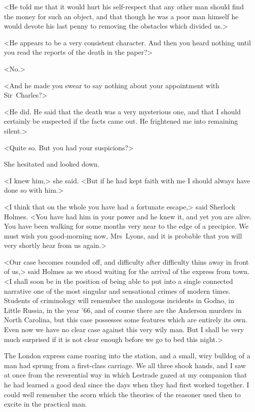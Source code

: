 <He told me that it would hurt his self-respect that any other man should find the money for such an object, and that though he was a poor man himself he would devote his last penny to removing the obstacles which divided us.>

<He appears to be a very consistent character. And then you heard nothing until you read the reports of the death in the paper?>

<No.>

<And he made you swear to say nothing about your appointment with Sir~Charles?>

<He did. He said that the death was a very mysterious one, and that I should certainly be suspected if the facts came out. He frightened me into remaining silent.>

<Quite so. But you had your suspicions?>

She hesitated and looked down.

<I knew him,> she said. <But if he had kept faith with me I should always have done so with him.>

<I think that on the whole you have had a fortunate escape,> said Sherlock Holmes. <You have had him in your power and he knew it, and yet you are alive. You have been walking for some months very near to the edge of a precipice. We must wish you good-morning now, Mrs~Lyons, and it is probable that you will very shortly hear from us again.>

<Our case becomes rounded off, and difficulty after difficulty thins away in front of us,> said Holmes as we stood waiting for the arrival of the express from town. <I shall soon be in the position of being able to put into a single connected narrative one of the most singular and sensational crimes of modern times. Students of criminology will remember the analogous incidents in Godno, in Little Russia, in the year '66, and of course there are the Anderson murders in North Carolina, but this case possesses some features which are entirely its own. Even now we have no clear case against this very wily man. But I shall be very much surprised if it is not clear enough before we go to bed this night.>

The London express came roaring into the station, and a small, wiry bulldog of a man had sprung from a first-class carriage. We all three shook hands, and I saw at once from the reverential way in which Lestrade gazed at my companion that he had learned a good deal since the days when they had first worked together. I could well remember the scorn which the theories of the reasoner used then to excite in the practical man.

